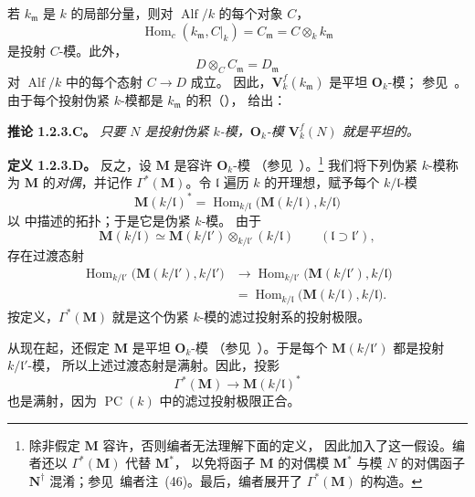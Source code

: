 若 \(k_{\mathfrak m}\) 是 \(k\) 的局部分量，则对
\(\operatorname{Alf}/k\) 的每个对象 \(C\)，
\[
  \operatorname{Hom}_c(k_{\mathfrak m},C|_k)
  =
  C_{\mathfrak m}
  =
  C\otimes_k k_{\mathfrak m}
\]
是投射 \(C\)-模。此外，
\[
  D\otimes_C C_{\mathfrak m}=D_{\mathfrak m}
\]
对 \(\operatorname{Alf}/k\) 中的每个态射 \(C\longrightarrow D\) 成立。
因此，\(\mathbf V_k^f(k_{\mathfrak m})\) 是平坦 \(\mathbf O_k\)-模；
参见\ 。由于每个投射伪紧 \(k\)-模都是
\(k_{\mathfrak m}\) 的积（），
 给出：

\medskip
\noindent\textbf{推论 1.2.3.C。}
\label{sga3:VIIB:1.2.3.C}
\textit{只要 \(N\) 是投射伪紧 \(k\)-模，\(\mathbf O_k\)-模
\(\mathbf V_k^f(N)\) 就是平坦的。}

\medskip
\noindent\textbf{定义 1.2.3.D。}
\label{sga3:VIIB:1.2.3.D}
反之，设 \(\mathbf M\) 是容许 \(\mathbf O_k\)-模
（参见\ ）。\footnote{
\label{sga3:VIIB:nde:47}除非假定 \(\mathbf M\) 容许，否则编者无法理解下面的定义，
因此加入了这一假设。编者还以 \(\Gamma^*(\mathbf M)\) 代替 \(\mathbf M^*\)，
以免将函子 \(\mathbf M\) 的对偶模 \(\mathbf M^*\) 与模 \(N\) 的对偶函子
\(\mathbf N^\dagger\) 混淆；参见\ 编者注~(46)。最后，编者展开了
\(\Gamma^*(\mathbf M)\) 的构造。}
我们将下列伪紧 \(k\)-模称为 \(\mathbf M\) 的\emph{对偶}，并记作
\(\Gamma^*(\mathbf M)\)。令 \(\mathfrak l\) 遍历 \(k\) 的开理想，赋予每个
\(k/\mathfrak l\)-模
\[
  \mathbf M(k/\mathfrak l)^*
  =
  \operatorname{Hom}_{k/\mathfrak l}
    \bigl(\mathbf M(k/\mathfrak l),k/\mathfrak l\bigr)
\]
以  中描述的拓扑；于是它是伪紧 \(k\)-模。
由于
\[
  \mathbf M(k/\mathfrak l)
  \simeq
  \mathbf M(k/\mathfrak l')
    \otimes_{k/\mathfrak l'}(k/\mathfrak l)
  \qquad
  (\mathfrak l\supset\mathfrak l'),
\]
存在过渡态射
\[
  \begin{split}
  \operatorname{Hom}_{k/\mathfrak l'}
    \bigl(\mathbf M(k/\mathfrak l'),k/\mathfrak l'\bigr)
  &\longrightarrow
  \operatorname{Hom}_{k/\mathfrak l'}
    \bigl(\mathbf M(k/\mathfrak l'),k/\mathfrak l\bigr)\\
  &=
  \operatorname{Hom}_{k/\mathfrak l}
    \bigl(\mathbf M(k/\mathfrak l),k/\mathfrak l\bigr).
  \end{split}
\]
按定义，\(\Gamma^*(\mathbf M)\) 就是这个伪紧 \(k\)-模的滤过投射系的投射极限。

从现在起，还假定 \(\mathbf M\) 是平坦 \(\mathbf O_k\)-模
（参见\ ）。于是每个
\(\mathbf M(k/\mathfrak l')\) 都是投射 \(k/\mathfrak l'\)-模，
所以上述过渡态射是满射。因此，投影
\[
  \Gamma^*(\mathbf M)
  \longrightarrow
  \mathbf M(k/\mathfrak l)^*
\]
也是满射，因为 \(\operatorname{PC}(k)\) 中的滤过投射极限正合。


